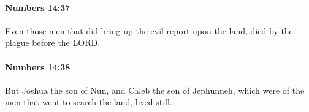 		\paragraph{Numbers 14:37} %
			\label{NUMBERS-14-37}

			Even those men that did bring up the evil report upon the land, died by the plague before the LORD.


		\paragraph{Numbers 14:38} %
			\label{NUMBERS-14-38}

			But Joshua the son of Nun, and Caleb the son of Jephunneh, which were of the men that went to search the land, lived still.


